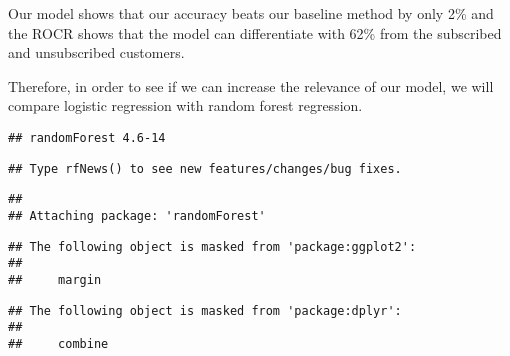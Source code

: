 \documentclass[]{article}
\newenvironment{Shaded}{\begin{snugshade}}{\end{snugshade}}
\newcommand{\KeywordTok}[1]{\textcolor[rgb]{0.13,0.29,0.53}{\textbf{#1}}}
\newcommand{\DataTypeTok}[1]{\textcolor[rgb]{0.13,0.29,0.53}{#1}}
\newcommand{\DecValTok}[1]{\textcolor[rgb]{0.00,0.00,0.81}{#1}}
\newcommand{\StringTok}[1]{\textcolor[rgb]{0.31,0.60,0.02}{#1}}
\newcommand{\OperatorTok}[1]{\textcolor[rgb]{0.81,0.36,0.00}{\textbf{#1}}}
\newcommand{\NormalTok}[1]{#1}
\begin{document}
Our model shows that our accuracy beats our baseline method by only 2\%
and the ROCR shows that the model can differentiate with 62\% from the
subscribed and unsubscribed customers.

Therefore, in order to see if we can increase the relevance of our
model, we will compare logistic regression with random forest
regression.

\begin{verbatim}
## randomForest 4.6-14
\end{verbatim}

\begin{verbatim}
## Type rfNews() to see new features/changes/bug fixes.
\end{verbatim}

\begin{verbatim}
## 
## Attaching package: 'randomForest'
\end{verbatim}

\begin{verbatim}
## The following object is masked from 'package:ggplot2':
## 
##     margin
\end{verbatim}

\begin{verbatim}
## The following object is masked from 'package:dplyr':
## 
##     combine
\end{verbatim}

\begin{Shaded}
\end{Shaded}
\end{document}
